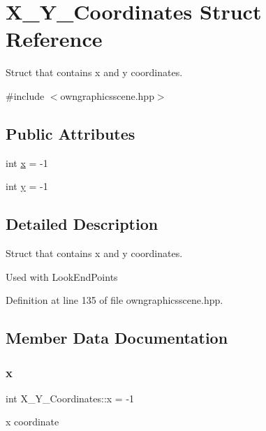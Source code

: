 \hypertarget{structX__Y__Coordinates}{}\section{X\+\_\+\+Y\+\_\+\+Coordinates Struct Reference}
\label{structX__Y__Coordinates}


Struct that contains x and y coordinates.  




{\ttfamily \#include $<$owngraphicsscene.\+hpp$>$}

\subsection*{Public Attributes}
\begin{DoxyCompactItemize}
\item 
int \mbox{\hyperlink{structX__Y__Coordinates_a89f7ab800d6777b26a037e82501c6798}{x}} = -\/1
\item 
int \mbox{\hyperlink{structX__Y__Coordinates_a4a608b81d10b65d5b12596ca82df34f6}{y}} = -\/1
\end{DoxyCompactItemize}


\subsection{Detailed Description}
Struct that contains x and y coordinates. 

Used with Look\+End\+Points 

Definition at line 135 of file owngraphicsscene.\+hpp.



\subsection{Member Data Documentation}
\mbox{\label{structX__Y__Coordinates_a89f7ab800d6777b26a037e82501c6798}} 
\subsubsection{\texorpdfstring{x}{x}}
{\footnotesize\ttfamily int X\+\_\+\+Y\+\_\+\+Coordinates\+::x = -\/1}

x coordinate 

